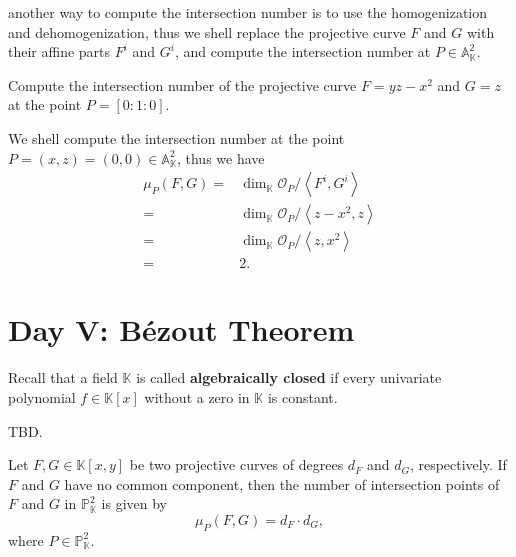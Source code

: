 \documentclass[10pt]{article}
\begin{document}
another way to compute the intersection number is to use the homogenization and dehomogenization, thus we shell replace the projective curve $ F$ and $ G$ with their affine parts $ F^{i}$ and $ G^{i}$, and compute the intersection number at $ P \in \mathbb{A}^{2}_{\mathbb{K}}$.
\begin{example}
  Compute the intersection number of the projective curve $ F = yz - x^{2}$ and $ G = z$ at the point $ P = [0:1:0]$.
\end{example}
\begin{solution}
  We shell compute the intersection number at the point $ P = (x,z) = (0,0) \in \mathbb{A}_{\mathbb{K}}^{2}$, thus we have
  \begin{equation*}
    \begin{aligned}
      \mu_{P}(F,G) = & \dim_{\mathbb{K}} \mathcal{O}_{P} / \left< F^{i}, G^{i} \right>\\
      = & \dim_{\mathbb{K}} \mathcal{O}_{P} / \left< z - x^{2}, z \right>\\
      = & \dim_{\mathbb{K}} \mathcal{O}_{P} / \left< z, x^{2} \right>\\
      = & 2.
    \end{aligned}
  \end{equation*}
\end{solution}

\section{Day V: B\'ezout Theorem}

Recall that a field $ \mathbb{K}$ is called \textbf{algebraically closed} if every univariate polynomial $f \in \mathbb{K}[x]$ without a zero in $\mathbb{K}$ is constant.

\begin{theorem}
  TBD.
\end{theorem}

\begin{theorem}
  Let $ F, G \in \mathbb{K}[x,y]$ be two projective curves of degrees $ d_F$ and $ d_G$, respectively. If $ F$ and $ G$ have no common component, then the number of intersection points of $ F$ and $ G$ in $\mathbb{P}^2_{\mathbb{K}}$ is given by
  \begin{equation*}
    \mu_{P}(F,G) = d_F \cdot d_G,
  \end{equation*}
  where $ P \in \mathbb{P}^{2}_{\mathbb{K}}$.
\end{theorem}
\end{document}
